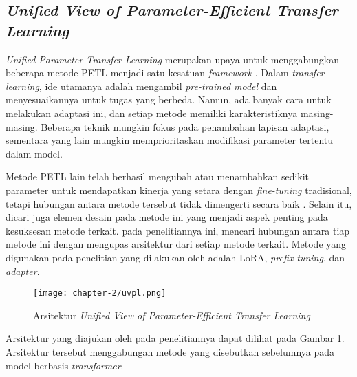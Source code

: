 \subsection{\textit{Unified View of Parameter-Efficient Transfer Learning}}

\textit{Unified Parameter Transfer Learning} merupakan upaya untuk menggabungkan beberapa metode PETL menjadi satu kesatuan \textit{framework} \parencite{uvpl}. Dalam \textit{transfer learning}, ide utamanya adalah mengambil \textit{pre-trained model} dan menyesuaikannya untuk tugas yang berbeda. Namun, ada banyak cara untuk melakukan adaptasi ini, dan setiap metode memiliki karakteristiknya masing-masing. Beberapa teknik mungkin fokus pada penambahan lapisan adaptasi, sementara yang lain mungkin memprioritaskan modifikasi parameter tertentu dalam model.

Metode PETL lain telah berhasil mengubah atau menambahkan sedikit parameter untuk mendapatkan kinerja yang setara dengan \textit{fine-tuning} tradisional, tetapi hubungan antara metode tersebut tidak dimengerti secara baik \parencite{uvpl}. Selain itu, dicari juga elemen desain pada metode ini yang menjadi aspek penting pada kesuksesan metode terkait. \citeauthor{uvpl} pada penelitiannya ini, mencari hubungan antara tiap metode ini dengan mengupas arsitektur dari setiap metode terkait. Metode yang digunakan pada penelitian yang dilakukan oleh \citeauthor{uvpl} adalah LoRA, \textit{prefix-tuning}, dan \textit{adapter}.

\begin{figure}[ht]
    \centering
    \texttt{[image: chapter-2/uvpl.png]}
    \caption{Arsitektur \textit{Unified View of Parameter-Efficient Transfer Learning} \parencite{uvpl}}
    \label{fig:uvpl}
\end{figure}

Arsitektur yang diajukan oleh \citeauthor{uvpl} pada penelitiannya dapat dilihat pada Gambar \ref{fig:uvpl}. Arsitektur tersebut menggabungan metode yang disebutkan sebelumnya pada model berbasis \textit{transformer}. 

